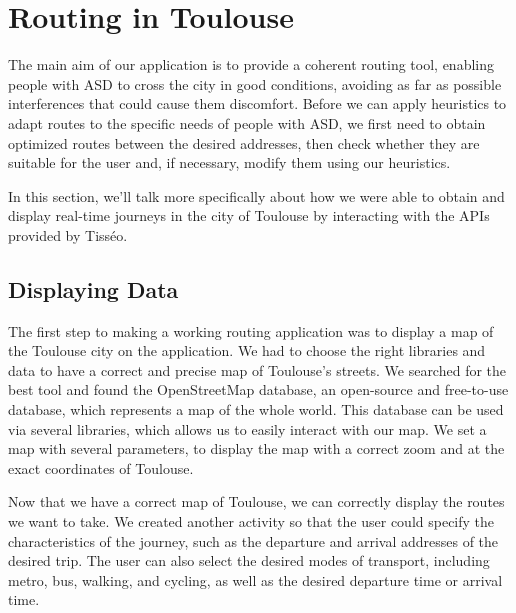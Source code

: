 \section{Routing in Toulouse}


The main aim of our application is to provide a coherent routing tool, enabling people with ASD to cross the city in good conditions, avoiding as far as possible interferences that could cause them discomfort. Before we can apply heuristics to adapt routes to the specific needs of people with ASD, we first need to obtain optimized routes between the desired addresses, then check whether they are suitable for the user and, if necessary, modify them using our heuristics.


In this section, we'll talk more specifically about how we were able to obtain and display real-time journeys in the city of Toulouse by interacting with the APIs provided by Tisséo.


\subsection{Displaying Data}


The first step to making a working routing application was to display a map of the Toulouse city on the application. We had to choose the right libraries and data to have a correct and precise map of Toulouse's streets. We searched for the best tool and found the OpenStreetMap database, an open-source and free-to-use database, which represents a map of the whole world. This database can be used via several libraries, which allows us to easily interact with our map. We set a map with several parameters, to display the map with a correct zoom and at the exact coordinates of Toulouse.


Now that we have a correct map of Toulouse, we can correctly display the routes we want to take. We created another activity so that the user could specify the characteristics of the journey, such as the departure and arrival addresses of the desired trip. The user can also select the desired modes of transport, including metro, bus, walking, and cycling, as well as the desired departure time or arrival time.



